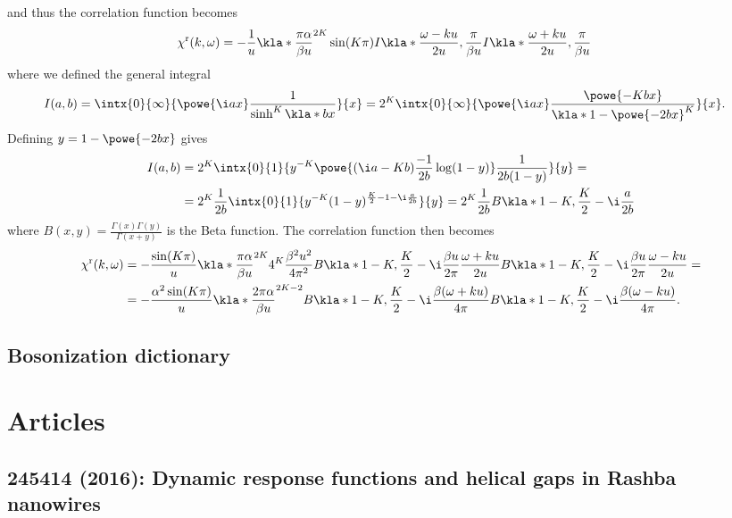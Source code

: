 \documentclass[english, parskip=full]{scrartcl}
\renewcommand{\r}{\text{r}}
\begin{document}
and thus the correlation function becomes
\begin{align}
\chi^\r(k,\omega) &= -\frac{1}{u} \kla*{\frac{\pi\alpha}{\beta u}}^{2K} \sin(K\pi)  I\kla*{\frac{\omega - ku}{2u}, \frac{\pi}{\beta u}} I\kla*{\frac{\omega + ku}{2u}, \frac{\pi}{\beta u}}
\end{align}
where we defined the general integral
\begin{align}
I(a, b) &= \intx{0}{\infty}{ \powe{\i ax } \frac{1}{\sinh^K\kla*{bx} } }{x} = 2^K \intx{0}{\infty}{\powe{\i ax} \frac{\powe{- Kbx}}{\kla*{1 - \powe{- 2bx}}^K} }{x}.
\end{align}
Defining $y = 1 - \powe{-2bx}$ gives
\begin{align}
I(a,b) &= 2^K \intx{0}{1}{y^{-K} \powe{ (\i a - Kb) \frac{-1}{2b}\log (1-y)} \frac{1}{2b(1-y)} }{y} = \\
&= 2^K \frac{1}{2b} \intx{0}{1}{y^{-K} (1-y)^{\frac{K}{2} - 1 - \i\frac{a}{2b}} }{y} = 2^K \frac{1}{2b} B\kla*{1-K, \frac{K}{2} - \i \frac{a}{2b}}
\end{align}
where $B(x,y) = \frac{\Gamma(x)\Gamma(y)}{\Gamma(x+y)}$ is the Beta function.
The correlation function then becomes
\begin{align}
\chi^\r(k,\omega) &= -\frac{\sin(K\pi)}{u} \kla*{\frac{\pi\alpha}{\beta u}}^{2K}  4^K \frac{\beta^2 u^2}{4\pi^2} B\kla*{1 - K, \frac{K}{2} - \i \frac{\beta u}{2\pi} \frac{\omega + ku}{2u}} B\kla*{1 - K, \frac{K}{2} - \i \frac{\beta u}{2\pi} \frac{\omega - ku}{2u}} = \\
&= -\frac{\alpha^2\sin(K\pi)}{u} \kla*{\frac{2\pi\alpha}{\beta u}}^{2K-2} B\kla*{1 - K, \frac{K}{2} - \i \frac{\beta (\omega + ku)}{4\pi}} B\kla*{1 - K, \frac{K}{2} - \i \frac{\beta (\omega - ku)}{4\pi}}.
\end{align}
\subsection{Bosonization dictionary}
\section{Articles}
\subsection{245414 (2016): Dynamic response functions and helical gaps in Rashba nanowires}
\end{document}
